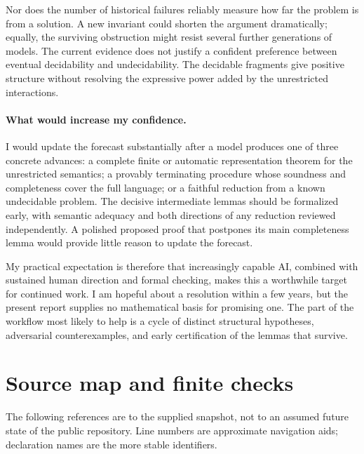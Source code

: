 \documentclass[11pt,letterpaper]{article}
\theoremstyle{definition}
\theoremstyle{remark}
\begin{document}
Nor does the number of historical failures reliably measure how far the
problem is from a solution. A new invariant could shorten the argument
dramatically; equally, the surviving obstruction might resist several
further generations of models. The current evidence does not justify a
confident preference between eventual decidability and undecidability.
The decidable fragments give positive structure without resolving the
expressive power added by the unrestricted interactions.

\paragraph{What would increase my confidence.}
I would update the forecast substantially after a model produces one of
three concrete advances: a complete finite or automatic representation
theorem for the unrestricted semantics; a provably terminating procedure
whose soundness and completeness cover the full language; or a faithful
reduction from a known undecidable problem. The decisive intermediate
lemmas should be formalized early, with semantic adequacy and both
directions of any reduction reviewed independently. A polished proposed
proof that postpones its main completeness lemma would provide little
reason to update the forecast.

My practical expectation is therefore that increasingly capable AI,
combined with sustained human direction and formal checking, makes this
a worthwhile target for continued work. I am hopeful about a resolution
within a few years, but the present report supplies no mathematical basis
for promising one. The part of the workflow most likely to help is a
cycle of distinct structural hypotheses, adversarial counterexamples,
and early certification of the lemmas that survive.

\appendix
\section{Source map and finite checks}
\label{app:evidence}

The following references are to the supplied snapshot, not to an assumed
future state of the public repository. Line numbers are approximate
navigation aids; declaration names are the more stable identifiers.
\end{document}
